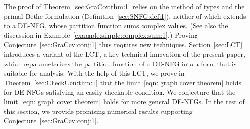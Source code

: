 \documentclass[journal]{IEEEtran}
\newcommand{\add}[1]{{\color{black}#1}}
\begin{document}
\add{The proof of Theorem~\ref{sec:GraCov:thm:1} relies on the method of types
  and the primal Bethe formulation (Definition~\ref{sec:SNFG:def:1}), neither
  of which extends to a DE-NFG, whose partition function sums complex
  values. (See also the discussion in
  Example~\ref{example:simple:complex:sum:1}.) Proving
  Conjecture~\ref{sec:GraCov:conj:1} thus requires new techniques.}
Section~\ref{sec:LCT} introduces a variant of the LCT, a key technical
innovation of the present paper, which reparameterizes the partition function
of a DE-NFG into a form that is suitable for analysis. With the help of this
LCT, we prove in Theorem~\ref{sec:CheckCon:thm:1} that the limit~\eqref{eqn:
  graph cover theorem} holds for DE-NFGs satisfying an easily checkable
condition. We conjecture that the limit~\eqref{eqn: graph cover theorem} holds
for more general DE-NFGs. In the rest of this section, we provide promising
numerical results supporting Conjecture~\ref{sec:GraCov:conj:1}.


\end{document}
